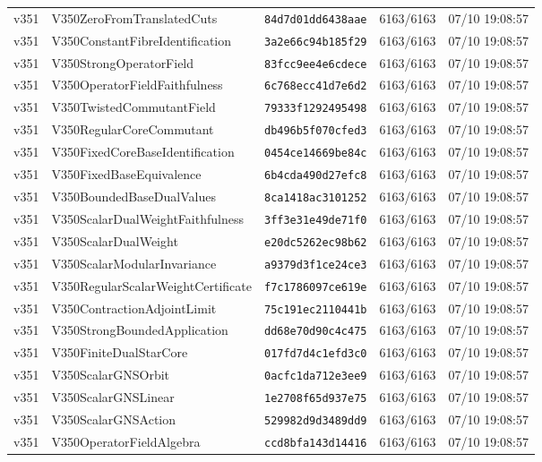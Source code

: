 \documentclass[11pt]{article}
\theoremstyle{definition}\newtheorem{deriv}{Derivation}
\begin{document}
{\begin{longtable}{@{}lllll@{}}
v351 & V350ZeroFromTranslatedCuts & \texttt{84d7d01dd6438aae} & 6163/6163 & 07/10 19:08:57 \\
v351 & V350ConstantFibreIdentification & \texttt{3a2e66c94b185f29} & 6163/6163 & 07/10 19:08:57 \\
v351 & V350StrongOperatorField & \texttt{83fcc9ee4e6cdece} & 6163/6163 & 07/10 19:08:57 \\
v351 & V350OperatorFieldFaithfulness & \texttt{6c768ecc41d7e6d2} & 6163/6163 & 07/10 19:08:57 \\
v351 & V350TwistedCommutantField & \texttt{79333f1292495498} & 6163/6163 & 07/10 19:08:57 \\
v351 & V350RegularCoreCommutant & \texttt{db496b5f070cfed3} & 6163/6163 & 07/10 19:08:57 \\
v351 & V350FixedCoreBaseIdentification & \texttt{0454ce14669be84c} & 6163/6163 & 07/10 19:08:57 \\
v351 & V350FixedBaseEquivalence & \texttt{6b4cda490d27efc8} & 6163/6163 & 07/10 19:08:57 \\
v351 & V350BoundedBaseDualValues & \texttt{8ca1418ac3101252} & 6163/6163 & 07/10 19:08:57 \\
v351 & V350ScalarDualWeightFaithfulness & \texttt{3ff3e31e49de71f0} & 6163/6163 & 07/10 19:08:57 \\
v351 & V350ScalarDualWeight & \texttt{e20dc5262ec98b62} & 6163/6163 & 07/10 19:08:57 \\
v351 & V350ScalarModularInvariance & \texttt{a9379d3f1ce24ce3} & 6163/6163 & 07/10 19:08:57 \\
v351 & V350RegularScalarWeightCertificate & \texttt{f7c1786097ce619e} & 6163/6163 & 07/10 19:08:57 \\
v351 & V350ContractionAdjointLimit & \texttt{75c191ec2110441b} & 6163/6163 & 07/10 19:08:57 \\
v351 & V350StrongBoundedApplication & \texttt{dd68e70d90c4c475} & 6163/6163 & 07/10 19:08:57 \\
v351 & V350FiniteDualStarCore & \texttt{017fd7d4c1efd3c0} & 6163/6163 & 07/10 19:08:57 \\
v351 & V350ScalarGNSOrbit & \texttt{0acfc1da712e3ee9} & 6163/6163 & 07/10 19:08:57 \\
v351 & V350ScalarGNSLinear & \texttt{1e2708f65d937e75} & 6163/6163 & 07/10 19:08:57 \\
v351 & V350ScalarGNSAction & \texttt{529982d9d3489dd9} & 6163/6163 & 07/10 19:08:57 \\
v351 & V350OperatorFieldAlgebra & \texttt{ccd8bfa143d14416} & 6163/6163 & 07/10 19:08:57 \\

\end{longtable}}
\end{document}
